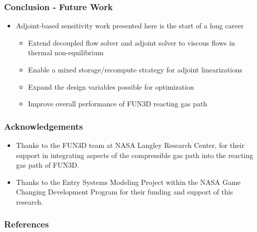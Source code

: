 \documentclass{beamer}
\begin{document}
\begin{frame}
  \frametitle{Conclusion - Future Work}
  \begin{itemize}
    \item Adjoint-based sensitivity work presented here is the start of a
      long career
    \begin{itemize}
      \item Extend decoupled flow solver and adjoint solver to viscous flows in
        thermal non-equilibrium
      \item Enable a mixed storage/recompute strategy for adjoint linearizations
      \item Expand the design variables possible for optimization
      \item Improve overall performance of FUN3D reacting gas path
    \end{itemize}
  \end{itemize}
\end{frame}

\begin{frame}
  \frametitle{Acknowledgements}
  \begin{itemize}
    \item Thanks to the FUN3D team at NASA Langley Research Center, for their
      support in integrating aspects of the compressible gas path into the
      reacting gas path of FUN3D.
   \item Thanks to the Entry Systems Modeling Project within the NASA
     Game Changing Development Program for their funding and support of this research.  
  \end{itemize}
\end{frame}

\begin{frame}[t,allowframebreaks]
  \frametitle{References}
  \printbibliography
\end{frame}
\end{document}
